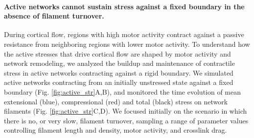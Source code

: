 \paragraph{Active networks cannot sustain stress against a fixed boundary in the absence of filament turnover.}

During cortical flow, regions with high motor activity contract against a passive resistance from neighboring regions with lower motor activity.  To understand how the active stresses that drive cortical flow are shaped by motor activity and network remodeling, we analyzed the buildup and maintenance of contractile stress in active networks contracting against a rigid boundary. We simulated active networks contracting from an initially unstressed state against a fixed boundary (Fig. \ref{fig:active_str}A,B), and  monitored the time evolution of mean extensional (blue), compressional (red) and total (black) stress on network filaments (Fig. \ref{fig:active_str}C,D). We focused initially on the scenario in which there is no, or very slow, filament turnover, sampling a range of parameter values controlling filament length and density, motor activity, and crosslink drag. 

